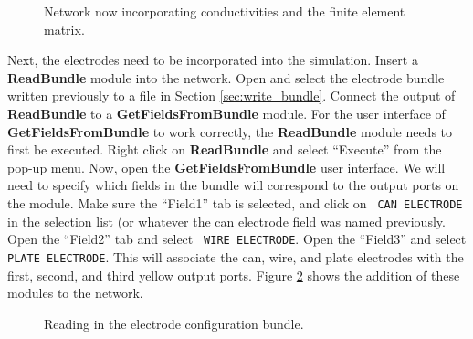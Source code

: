 \documentclass[fleqn,11pt,openany]{book}
\begin{document}
\begin{figure}
\caption{Network now incorporating conductivities and the finite
element matrix.}\label{fig:defib_fem_nw_03}
\end{figure}

Next, the electrodes need to be incorporated into the
simulation. Insert a {\bf ReadBundle} module into the network. Open
and select the electrode bundle written previously to a file in
Section \ref{sec:write_bundle}. Connect the output of {\bf ReadBundle}
to a {\bf GetFieldsFromBundle} module. For the user interface of {\bf
GetFieldsFromBundle} to work correctly, the {\bf ReadBundle} module
needs to first be executed. Right click on {\bf ReadBundle} and select
``Execute'' from the pop-up menu. Now, open the {\bf
GetFieldsFromBundle} user interface. We will need to specify which
fields in the bundle will correspond to the output ports on the
module. Make sure the ``Field1'' tab is selected, and click on {\tt
CAN ELECTRODE} in the selection list (or whatever the can electrode
field was named previously. Open the ``Field2'' tab and select {\tt
WIRE ELECTRODE}. Open the ``Field3'' and select {\tt PLATE
ELECTRODE}. This will associate the can, wire, and plate electrodes
with the first, second, and third yellow output ports. Figure
\ref{fig:defib_fem_nw_04} shows the addition of these modules to the
network.

\begin{figure}
\caption{Reading in the electrode configuration
bundle.}\label{fig:defib_fem_nw_04}
\end{figure}
\end{document}
